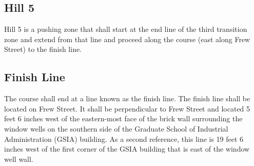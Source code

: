 \subsection{Hill 5}

	Hill 5 is a pushing zone that shall start at the end line of the third transition 
	zone and extend from that line and proceed along the course (east along Frew 
	Street) to the finish line.

\subsection{Finish Line}

	The course shall end at a line known as the finish line. The finish line shall
	be located on Frew Street. It shall be perpendicular to Frew Street and located
	5 feet 6 inches west of the eastern-most face of the brick wall surrounding the
	window wells on the southern side of the Graduate School of Industrial
	Administration (GSIA) building. As a second reference, this line is 19 feet 6
	inches west of the first corner of the GSIA building that is east of the window
	well wall.


